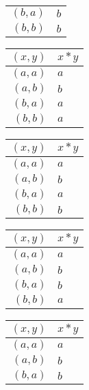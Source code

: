 \begin{enumerate}[label={\Alph*.},font={\bfseries}]
\begin{enumerate}[label={\arabic*},font={\bfseries}]
\begin{minipage}[h]{.25\textwidth}
\begin{tabular}{ r | l }
            $(b,a)$ & $b$ \\
            $(b,b)$ & $b$
          \end{tabular}
        \end{minipage}
        \begin{minipage}[h]{.25\textwidth}
          \begin{tabular}{ r | l }
            $(x,y)$ & $x*y$ \\
            \hline
            $(a,a)$ & $a$ \\
            $(a,b)$ & $b$ \\
            $(b,a)$ & $a$ \\
            $(b,b)$ & $a$
          \end{tabular}
        \end{minipage}
        \begin{minipage}[h]{.25\textwidth}
          \begin{tabular}{ r | l }
            $(x,y)$ & $x*y$ \\
            \hline
            $(a,a)$ & $a$ \\
            $(a,b)$ & $b$ \\
            $(b,a)$ & $a$ \\
            $(b,b)$ & $b$
          \end{tabular}
        \end{minipage}
        \begin{minipage}[h]{.25\textwidth}
          \begin{tabular}{ r | l }
            $(x,y)$ & $x*y$ \\
            \hline
            $(a,a)$ & $a$ \\
            $(a,b)$ & $b$ \\
            $(b,a)$ & $b$ \\
            $(b,b)$ & $a$
          \end{tabular}
        \end{minipage}
        \begin{minipage}[h]{.25\textwidth}
          \begin{tabular}{ r | l }
            $(x,y)$ & $x*y$ \\
            \hline
            $(a,a)$ & $a$ \\
            $(a,b)$ & $b$ \\
            $(b,a)$ & $b$ \\

\end{tabular}
\end{minipage}
\end{enumerate}
\end{enumerate}
